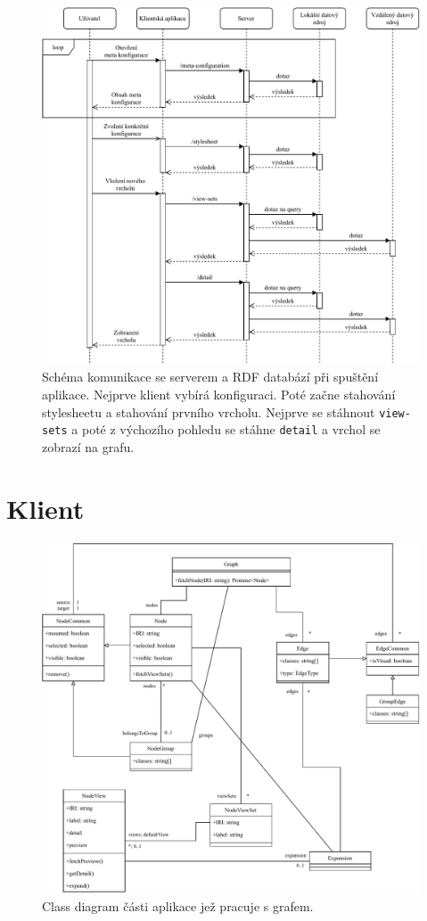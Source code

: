 \begin{figure}[p]
    \centering
    \includegraphics[width=\textwidth]{media/sequence-server.pdf}
    \caption{Schéma komunikace se serverem a RDF databází při spuštění aplikace. Nejprve klient vybírá konfiguraci. Poté začne stahování stylesheetu a stahování prvního vrcholu. Nejprve se stáhnout \texttt{view-sets} a poté z výchozího pohledu se stáhne \texttt{detail} a vrchol se zobrazí na grafu.}
\end{figure}


\section{Klient}

\begin{figure}
    \centering
    \includegraphics[width=\textwidth]{media/graph.pdf}
    \caption{Class diagram části aplikace jež pracuje s grafem.}
\end{figure}


